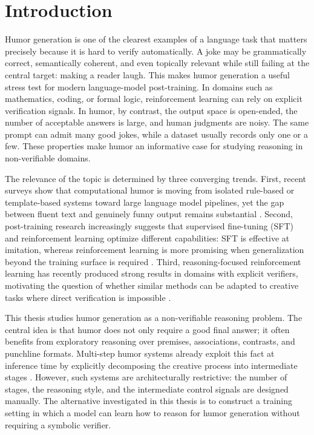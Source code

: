 \documentclass[14pt,a4paper]{extreport}
\begin{document}

\tableofcontents
\clearpage

\chapter*{Introduction}

Humor generation is one of the clearest examples of a language task that matters precisely because it is hard to verify automatically. A joke may be grammatically correct, semantically coherent, and even topically relevant while still failing at the central target: making a reader laugh. This makes humor generation a useful stress test for modern language-model post-training. In domains such as mathematics, coding, or formal logic, reinforcement learning can rely on explicit verification signals. In humor, by contrast, the output space is open-ended, the number of acceptable answers is large, and human judgments are noisy. The same prompt can admit many good jokes, while a dataset usually records only one or a few. These properties make humor an informative case for studying reasoning in non-verifiable domains.

The relevance of the topic is determined by three converging trends. First, recent surveys show that computational humor is moving from isolated rule-based or template-based systems toward large language model pipelines, yet the gap between fluent text and genuinely funny output remains substantial \citep{Loakman2025}. Second, post-training research increasingly suggests that supervised fine-tuning (SFT) and reinforcement learning optimize different capabilities: SFT is effective at imitation, whereas reinforcement learning is more promising when generalization beyond the training surface is required \citep{Chu2025}. Third, reasoning-focused reinforcement learning has recently produced strong results in domains with explicit verifiers, motivating the question of whether similar methods can be adapted to creative tasks where direct verification is impossible \citep{DeepSeek2025,Zhou2025,Yu2025}.

This thesis studies humor generation as a non-verifiable reasoning problem. The central idea is that humor does not only require a good final answer; it often benefits from exploratory reasoning over premises, associations, contrasts, and punchline formats. Multi-step humor systems already exploit this fact at inference time by explicitly decomposing the creative process into intermediate stages \citep{Tikhonov2024,ZhangJ2025,Kim2025}. However, such systems are architecturally restrictive: the number of stages, the reasoning style, and the intermediate control signals are designed manually. The alternative investigated in this thesis is to construct a training setting in which a model can learn how to reason for humor generation without requiring a symbolic verifier.
\end{document}
